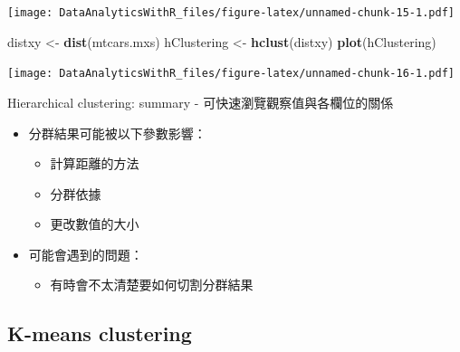 \documentclass[
]{book}
\newenvironment{Shaded}{\begin{snugshade}}{\end{snugshade}}
\newcommand{\KeywordTok}[1]{\textcolor[rgb]{0.13,0.29,0.53}{\textbf{#1}}}
\newcommand{\NormalTok}[1]{#1}
\newcommand{\StringTok}[1]{\textcolor[rgb]{0.31,0.60,0.02}{#1}}
\providecommand{\tightlist}{%
  \setlength{\itemsep}{0pt}\setlength{\parskip}{0pt}}
\begin{document}
\texttt{[image: DataAnalyticsWithR\_files/figure-latex/unnamed-chunk-15-1.pdf]}

\begin{Shaded}
\begin{Highlighting}[]
\NormalTok{distxy <-}\StringTok{ }\KeywordTok{dist}\NormalTok{(mtcars.mxs)}
\NormalTok{hClustering <-}\StringTok{ }\KeywordTok{hclust}\NormalTok{(distxy)}
\KeywordTok{plot}\NormalTok{(hClustering)}
\end{Highlighting}
\end{Shaded}

\texttt{[image: DataAnalyticsWithR\_files/figure-latex/unnamed-chunk-16-1.pdf]}

Hierarchical clustering: summary
- 可快速瀏覽觀察值與各欄位的關係

\begin{itemize}
\tightlist
\item
  分群結果可能被以下參數影響：

  \begin{itemize}
  \tightlist
  \item
    計算距離的方法
  \item
    分群依據
  \item
    更改數值的大小
  \end{itemize}
\item
  可能會遇到的問題：

  \begin{itemize}
  \tightlist
  \item
    有時會不太清楚要如何切割分群結果
  \end{itemize}
\end{itemize}

\hypertarget{k-means-clustering}{%
\subsection{K-means clustering}\label{k-means-clustering}}
\end{document}
